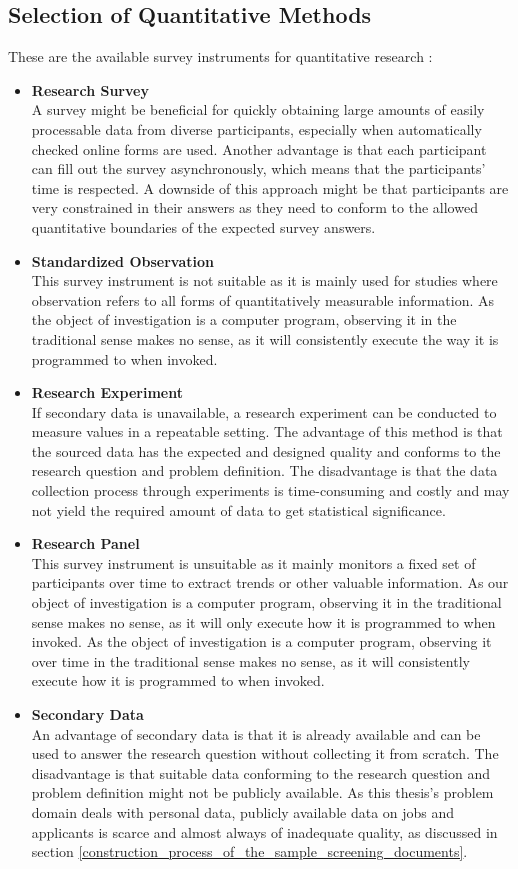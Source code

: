 \documentclass[draft,final]{thesisclass} %
\begin{document}
\subsection{Selection of Quantitative Methods}
These are the available survey instruments for quantitative research \parencite[15-16]{sw_du_krems}:
\begin{itemize}
    \item \textbf{Research Survey}\\
    A survey might be beneficial for quickly obtaining large amounts of easily processable data from diverse participants, especially when automatically checked online forms are used.
    Another advantage is that each participant can fill out the survey asynchronously, which means that the participants' time is respected.
    A downside of this approach might be that participants are very constrained in their answers as they need to conform to the allowed quantitative boundaries of the expected survey answers.
    \item \textbf{Standardized Observation}\\
    This survey instrument is not suitable as it is mainly used for studies where observation refers to all forms of quantitatively measurable information.
    As the object of investigation is a computer program, observing it in the traditional sense makes no sense, as it will consistently execute the way it is programmed to when invoked.
    \item \textbf{Research Experiment}\\
    If secondary data is unavailable, a research experiment can be conducted to measure values in a repeatable setting.
    The advantage of this method is that the sourced data has the expected and designed quality and conforms to the research question and problem definition.
    The disadvantage is that the data collection process through experiments is time-consuming and costly and may not yield the required amount of data to get statistical significance.
    \item \textbf{Research Panel}\\
    This survey instrument is unsuitable as it mainly monitors a fixed set of participants over time to extract trends or other valuable information. As our object of investigation is a computer program, observing it in the traditional sense makes no sense, as it will only execute how it is programmed to when invoked.
    As the object of investigation is a computer program, observing it over time in the traditional sense makes no sense, as it will consistently execute how it is programmed to when invoked.
    \item \textbf{Secondary Data}\\
    An advantage of secondary data is that it is already available and can be used to answer the research question without collecting it from scratch.
    The disadvantage is that suitable data conforming to the research question and problem definition might not be publicly available.
    As this thesis's problem domain deals with personal data, publicly available data on jobs and applicants is scarce and almost always of inadequate quality, as discussed in section \ref{construction_process_of_the_sample_screening_documents}.
\end{itemize}
\end{document}
